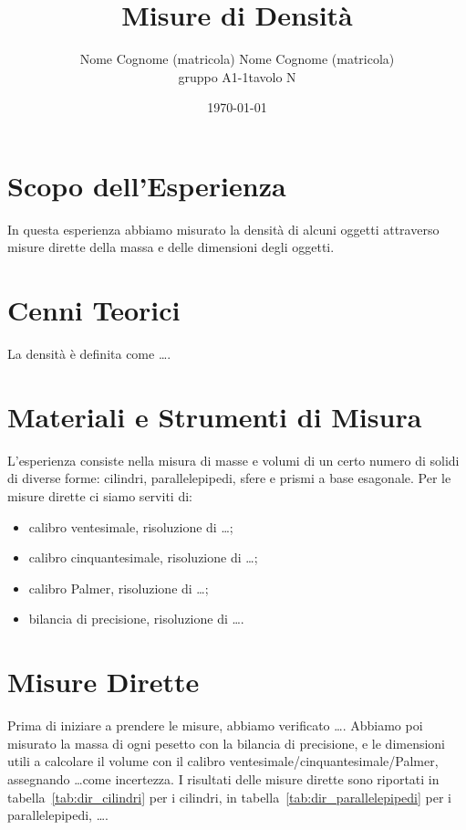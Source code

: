 \documentclass[a4paper]{article}
\title{Misure di Densit\`a}
\author{Nome Cognome (matricola)\quad
        \vspace{3mm}
        Nome Cognome (matricola)\\
        gruppo A1-1\quad tavolo N}
\date{\today}
\begin{document}
\maketitle
\section{Scopo dell'Esperienza}
In questa esperienza abbiamo misurato la densit\`a di alcuni oggetti attraverso misure dirette della massa e delle dimensioni degli oggetti.

\section{Cenni Teorici}
La densit\`a \`e definita come \ldots.

\section{Materiali e Strumenti di Misura}
L'esperienza consiste nella misura di masse e volumi di un certo numero di solidi di diverse forme: cilindri, parallelepipedi, sfere e prismi a base esagonale. Per le misure dirette ci siamo serviti di:
\begin{itemize}
    \item calibro ventesimale, risoluzione di \ldots;
    \item calibro cinquantesimale, risoluzione di \ldots;
    \item calibro Palmer, risoluzione di \ldots;
    \item bilancia di precisione, risoluzione di \ldots.
\end{itemize}

\section{Misure Dirette}

Prima di iniziare a prendere le misure, abbiamo verificato \ldots.
Abbiamo poi misurato la massa di ogni pesetto con la bilancia di precisione, 
e le dimensioni utili a calcolare il volume con il calibro ventesimale/cinquantesimale/Palmer, assegnando \ldots come incertezza. I risultati delle misure dirette sono riportati in tabella~\ref{tab:dir_cilindri} per i cilindri, in tabella~\ref{tab:dir_parallelepipedi} per i parallelepipedi, \ldots.
\end{document}
